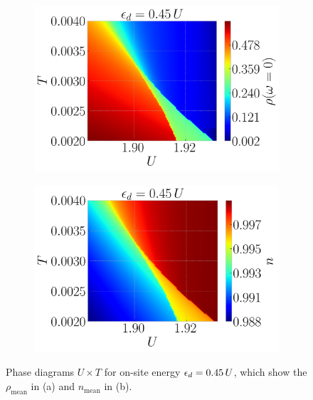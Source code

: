 \documentclass[12pt]{report}
\begin{document}
\begin{figure}[H]
\centering
\begin{subfigure}{.5\textwidth}
  \centering
  \includegraphics[width=\linewidth]{fig/dmft/mean2_0-mu045.png}
  \caption{}
  \label{fig:mu045-rho0}
\end{subfigure}%
\begin{subfigure}{.5\textwidth}
  \centering
  \includegraphics[width=\linewidth]{fig/dmft/mean2_n-mu045.png}
  \caption{}
  \label{fig:mu045-n}
\end{subfigure}
\caption{Phase diagrams $U \times T$ for on-site energy $\epsilon_d = 0.45 \, U$, which show the $\rho_{\text{mean}}$ in (a) and $n_{\text{mean}}$ in (b).}
\label{fig:mu045}
\end{figure}
\end{document}
